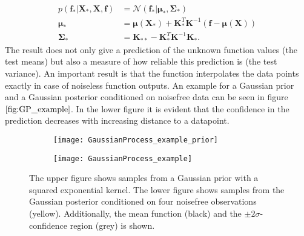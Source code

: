 \documentclass[../main.tex]{subfiles}
\begin{document}
\begin{align}
    p(\mathbf{f}_*|\mathbf{X}_*,\mathbf{X},\mathbf{f}) &= \mathcal{N}(\mathbf{f}_*|\boldsymbol{\mu}_*,\boldsymbol{\Sigma}_*)\\
    \boldsymbol{\mu}_* &= \boldsymbol{\mu}(\mathbf{X}_*)+\mathbf{K}^T_*\mathbf{K}^{-1}(\mathbf{f}-\boldsymbol{\mu}(\mathbf{X}))\\
    \boldsymbol{\Sigma}_* &= \mathbf{K}_{**} - \mathbf{K}^T_*\mathbf{K}^{-1}\mathbf{K}_*.
\end{align}
The result does not only give a prediction of the unknown function values (the test means) but also a measure of how reliable this prediction is (the test variance). An important result is that the function interpolates the data points exactly in case of noiseless function outputs. An example for a Gaussian prior and a Gaussian posterior conditioned on noisefree data can be seen in figure $\ref{fig:GP_example}$. In the lower figure it is evident that the confidence in the prediction decreases with increasing distance to a datapoint.\par

\begin{figure}
    \centering
    \begin{subfigure}[b]{\textwidth}
    \texttt{[image: GaussianProcess\_example\_prior]}
    \end{subfigure}
    
    \begin{subfigure}[b]{\textwidth}
    \texttt{[image: GaussianProcess\_example]}
    \end{subfigure}
    \caption{The upper figure shows samples from a Gaussian prior with a squared exponential kernel. The lower figure shows samples from the Gaussian posterior conditioned on four noisefree observations (yellow). Additionally, the mean function (black) and the $\pm 2 \sigma$-confidence region (grey) is shown.}    
    \label{fig:GP_example}
\end{figure}
\end{document}
